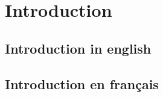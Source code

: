 
\ifdefined{}
\else
\setcounter{chapter}{0} %
\dominitoc
\faketableofcontents
\fi

\chapter*{Introduction}

\section*{Introduction in english}


\clearpage
\section*{Introduction en français}

